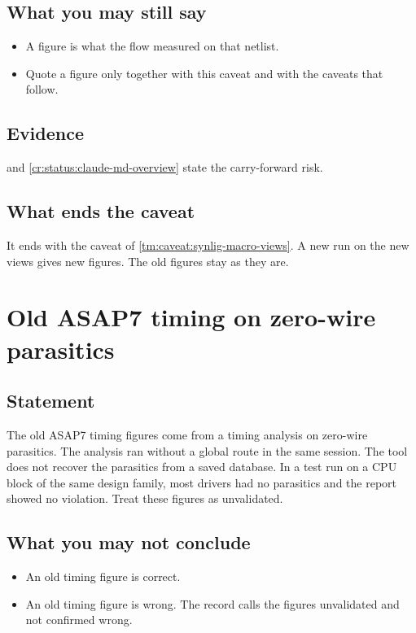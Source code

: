 \subsection*{What you may still say}
\begin{itemize}
  \item A figure is what the flow measured on that netlist.
  \item Quote a figure only together with this caveat and with the caveats that follow.
\end{itemize}

\subsection*{Evidence}
 and \cref{cr:status:claude-md-overview} state the carry-forward risk.

\subsection*{What ends the caveat}
It ends with the caveat of \cref{tm:caveat:synlig-macro-views}. A new run on the new views gives new figures. The old figures stay as they are.

\section{Old ASAP7 timing on zero-wire parasitics}\label{tm:caveat:asap7-zero-wire-timing}
\subsection*{Statement}
The old ASAP7 timing figures come from a timing analysis on zero-wire parasitics. The analysis ran without a global route in the same session. The tool does not recover the parasitics from a saved database. In a test run on a CPU block of the same design family, most drivers had no parasitics and the report showed no violation. Treat these figures as unvalidated.

\subsection*{What you may not conclude}
\begin{itemize}
  \item An old timing figure is correct.
  \item An old timing figure is wrong. The record calls the figures unvalidated and not confirmed wrong.
\end{itemize}

